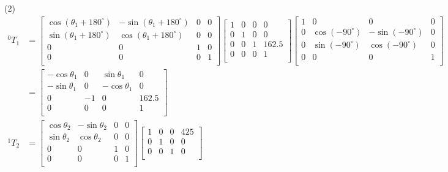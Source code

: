 \documentclass[UTF8, 13pt]{ctexart}
\begin{document}
(2)
\[
\begin{aligned}
{}^0T_1 &= \begin{bmatrix}
        \cos(\theta_1 + 180^\circ) & -\sin(\theta_1 + 180^\circ) & 0 & 0 \\
        \sin(\theta_1 + 180^\circ) & \cos(\theta_1 + 180^\circ) & 0 & 0 \\
        0 & 0 & 1 & 0 \\
        0 & 0 & 0 & 1 \\
        \end{bmatrix}
        \begin{bmatrix}
        1 & 0 & 0 & 0 \\
        0 & 1 & 0 & 0 \\
        0 & 0 & 1 & 162.5 \\
        0 & 0 & 0 & 1 \\
        \end{bmatrix}
        \begin{bmatrix}
        1 & 0 & 0 & 0 \\
        0 & \cos(-90^\circ) & -\sin(-90^\circ) & 0 \\
        0 & \sin(-90^\circ) & \cos(-90^\circ) & 0 \\
        0 & 0 & 0 & 1 \\
        \end{bmatrix} \\
        &= \begin{bmatrix}
        -\cos\theta_1 & 0 & \sin\theta_1 & 0 \\
        -\sin\theta_1 & 0 & -\cos\theta_1 & 0 \\
        0 & -1 & 0 & 162.5 \\
        0 & 0 & 0 & 1 \\
        \end{bmatrix} \\[1em]
{}^1T_2 &= \begin{bmatrix}
        \cos\theta_2 & -\sin\theta_2 & 0 & 0 \\
        \sin\theta_2 & \cos\theta_2 & 0 & 0 \\
        0 & 0 & 1 & 0 \\
        0 & 0 & 0 & 1 \\
        \end{bmatrix}
        \begin{bmatrix}
        1 & 0 & 0 & 425 \\
        0 & 1 & 0 & 0 \\
        0 & 0 & 1 & 0 \\

\end{bmatrix}
\end{aligned}\]
\end{document}
